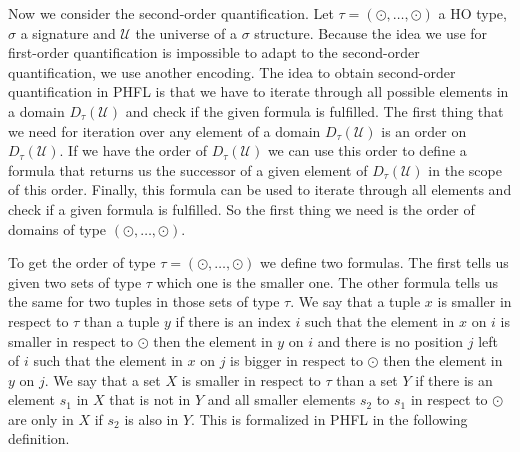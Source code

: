 Now we consider the second-order quantification. Let $\tau = (\odot, \dots, \odot)$ a HO type, $\sigma$ a signature and
$\mathcal{U}$ the universe of a $\sigma$ structure. Because the idea we use for first-order quantification is
impossible to adapt to the second-order quantification, we use another encoding. The idea to obtain second-order
quantification in PHFL is that we have to iterate through all possible elements in a domain $D_\tau(\mathcal{U})$ and
check if the given formula is fulfilled. The first thing that we need for iteration over any element of a domain
$D_\tau(\mathcal{U})$ is an order on $D_\tau(\mathcal{U})$. If we have the order of $D_\tau(\mathcal{U})$ we can use
this order to define a formula that returns us the successor of a given element of $D_\tau(\mathcal{U})$ in the scope
of this order. Finally, this formula can be used to iterate through all elements and check if a given formula is
fulfilled.
So the first thing we need is the order of domains of type $(\odot, \dots, \odot)$.

To get the order of type $\tau = (\odot, \dots, \odot)$ we define two formulas. The first tells us given two
sets of type $\tau$ which one is the smaller one. The other formula tells us the same for two tuples in those sets
of type $\tau$. We say that a tuple $x$ is smaller in respect to $\tau$ than a tuple $y$ if there is an index $i$ such
that the element in $x$ on $i$ is smaller in respect to $\odot$ then the element in $y$ on $i$ and there is no position
$j$ left of $i$ such that the element in $x$ on $j$ is bigger in respect to $\odot$ then the element in $y$ on $j$. We
say that a set $X$ is smaller in respect to $\tau$ than a set $Y$ if there is an element $s_1$ in $X$ that is not in $Y$
and all smaller elements $s_2$ to $s_1$ in respect to $\odot$ are only in $X$ if $s_2$ is also in $Y$. This is
formalized in PHFL in the following definition.

